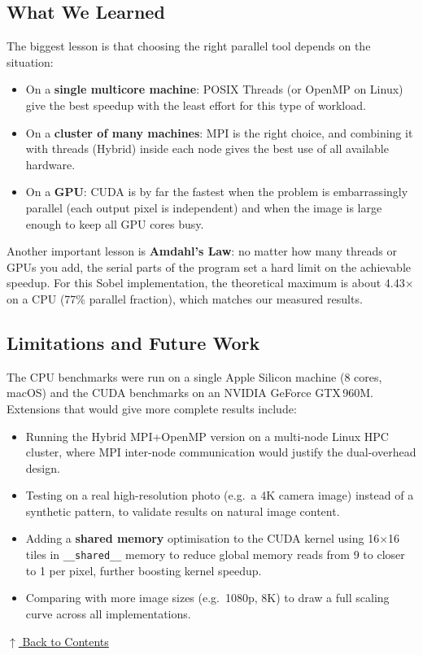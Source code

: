 \documentclass[12pt,a4paper]{article}
\begin{document}
\newpage
\subsection{What We Learned}

The biggest lesson is that choosing the right parallel tool depends on the
situation:
\begin{itemize}
  \item On a \textbf{single multicore machine}: POSIX Threads (or OpenMP on
        Linux) give the best speedup with the least effort for this type of
        workload.
  \item On a \textbf{cluster of many machines}: MPI is the right choice,
        and combining it with threads (Hybrid) inside each node gives the
        best use of all available hardware.
  \item On a \textbf{GPU}: CUDA is by far the fastest when the problem is
        embarrassingly parallel (each output pixel is independent) and when
        the image is large enough to keep all GPU cores busy.
\end{itemize}

Another important lesson is \textbf{Amdahl's Law}: no matter how many threads
or GPUs you add, the serial parts of the program set a hard limit on the
achievable speedup. For this Sobel implementation, the theoretical maximum is
about 4.43$\times$ on a CPU (77\% parallel fraction), which matches our
measured results.

\subsection{Limitations and Future Work}

The CPU benchmarks were run on a single Apple Silicon machine (8 cores, macOS)
and the CUDA benchmarks on an NVIDIA GeForce GTX\,960M. Extensions that would
give more complete results include:
\begin{itemize}
  \item Running the Hybrid MPI+OpenMP version on a multi-node Linux HPC cluster,
        where MPI inter-node communication would justify the dual-overhead design.
  \item Testing on a real high-resolution photo (e.g.\ a 4K camera image)
        instead of a synthetic pattern, to validate results on natural image content.
  \item Adding a \textbf{shared memory} optimisation to the CUDA kernel using
        16$\times$16 tiles in \texttt{\_\_shared\_\_} memory to reduce global
        memory reads from 9 to closer to 1 per pixel, further boosting kernel speedup.
  \item Comparing with more image sizes (e.g.\ 1080p, 8K) to draw a full
        scaling curve across all implementations.
\end{itemize}

\hyperref[contents]{\small $\uparrow$ Back to Contents}

\newpage


\end{document}
